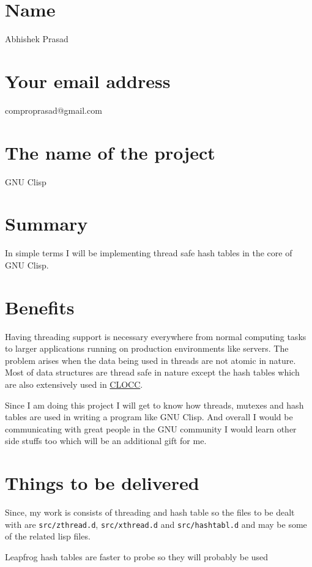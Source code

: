 \documentclass[11pt]{article}
\author{Compro Prasad}
\date{\today}
\title{}
\begin{document}
\section{Name}
\label{sec:org7b82c92}
Abhishek Prasad
\section{Your email address}
\label{sec:orgf6de055}
comproprasad@gmail.com
\section{The name of the project}
\label{sec:orge7eba49}
GNU Clisp
\section{Summary}
\label{sec:org9b5ca96}
In simple terms I will be implementing thread safe hash tables in the core of
GNU Clisp.
\section{Benefits}
\label{sec:org52e1722}
Having threading support is necessary everywhere from normal computing tasks to
larger applications running on production environments like servers. The problem
arises when the data being used in threads are not atomic in nature. Most of
data structures are thread safe in nature except the hash tables which are also
extensively used in \href{https://sourceforge.net/p/clocc/hg/ci/default/tree/}{CLOCC}.

Since I am doing this project I will get to know how threads, mutexes and hash
tables are used in writing a program like GNU Clisp. And overall I would be
communicating with great people in the GNU community I would learn other side
stuffs too which will be an additional gift for me.
\section{Things to be delivered}
\label{sec:org73d8522}
Since, my work is consists of threading and hash table so the files to be dealt
with are \texttt{src/zthread.d}, \texttt{src/xthread.d} and \texttt{src/hashtabl.d} and may be some
of the related lisp files.

Leapfrog hash tables are faster to probe so they will probably be used
\end{document}
